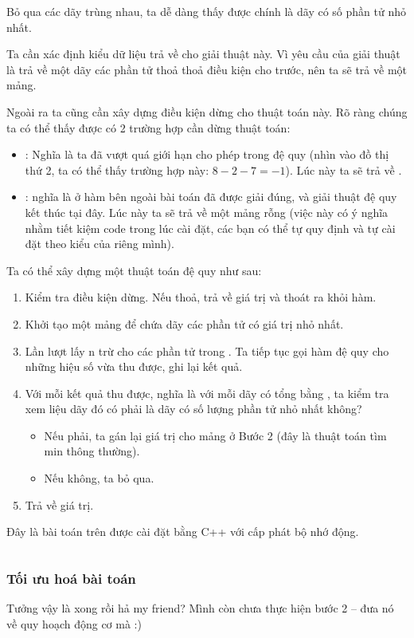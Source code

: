 \documentclass[main.tex]{subfiles}
\begin{document}
Bỏ qua các dãy trùng nhau, ta dễ dàng thấy được  chính là dãy có số phần tử nhỏ nhất.

Ta cần xác định kiểu dữ liệu trả về cho giải thuật này. Vì yêu cầu của giải thuật là trả về một dãy các phần tử thoả thoả điều kiện cho trước, nên ta sẽ trả về một mảng.

Ngoài ra ta cũng cần xây dựng điều kiện dừng cho thuật toán này. Rõ ràng chúng ta có thể thấy được có 2 trường hợp cần dừng thuật toán:
\begin{itemize}
    \item {}: Nghĩa là ta đã vượt quá giới hạn cho phép trong đệ quy (nhìn vào đồ thị thứ 2, ta có thể thấy trường hợp này: $8 - 2 - 7 = -1$). Lúc này ta sẽ trả về .
    \item {}: nghĩa là ở hàm bên ngoài bài toán đã được giải đúng, và giải thuật đệ quy kết thúc tại đây. Lúc này ta sẽ trả về một mảng rỗng (việc này có ý nghĩa nhằm tiết kiệm code trong lúc cài đặt, các bạn có thể tự quy định và tự cài đặt theo kiểu của riêng mình).
\end{itemize}

Ta có thể xây dựng một thuật toán đệ quy như sau:
\begin{enumerate}
    \item Kiểm tra điều kiện dừng. Nếu thoả, trả về giá trị và thoát ra khỏi hàm.
    \item Khởi tạo một mảng để chứa dãy các phần tử có giá trị nhỏ nhất.
    \item Lần lượt lấy \code n trừ cho các phần tử trong . Ta tiếp tục gọi hàm đệ quy cho những hiệu số vừa thu được, ghi lại kết quả.
    \item Với mỗi kết quả thu được, nghĩa là với mỗi dãy có tổng bằng , ta kiểm tra xem liệu dãy đó có phải là dãy có số lượng phần tử nhỏ nhất không?
    \begin{itemize}
        \item Nếu phải, ta gán lại giá trị cho mảng ở Bước 2 (đây là thuật toán tìm min thông thường).
        \item Nếu không, ta bỏ qua.
    \end{itemize}
    \item Trả về giá trị.
\end{enumerate}

Đây là bài toán trên được cài đặt bằng C++ với cấp phát bộ nhớ động.
\inputminted[linenos,breaklines]{cpp}{answer_sources/QuyHoachDong_VetCan.cpp}

\subsubsection{Tối ưu hoá bài toán}
Tưởng vậy là xong rồi hả my friend? Mình còn chưa thực hiện bước 2 -- đưa nó về quy hoạch động cơ mà :)
\end{document}
